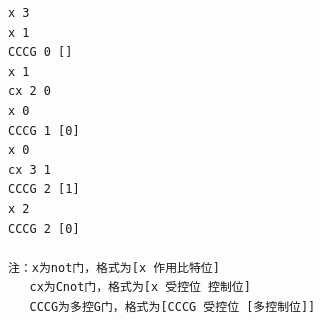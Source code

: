 \documentclass[10.5pt,compsoc,UTF8]{CjC}
\theoremstyle{mystyle}
\begin{document}
\begin{verbatim}
x 3
x 1
CCCG 0 []
x 1
cx 2 0
x 0
CCCG 1 [0]
x 0
cx 3 1
CCCG 2 [1]
x 2
CCCG 2 [0]

注：x为not门，格式为[x 作用比特位]
   cx为Cnot门，格式为[x 受控位 控制位]
   CCCG为多控G门，格式为[CCCG 受控位 [多控制位]]


\end{verbatim}















\end{document}

